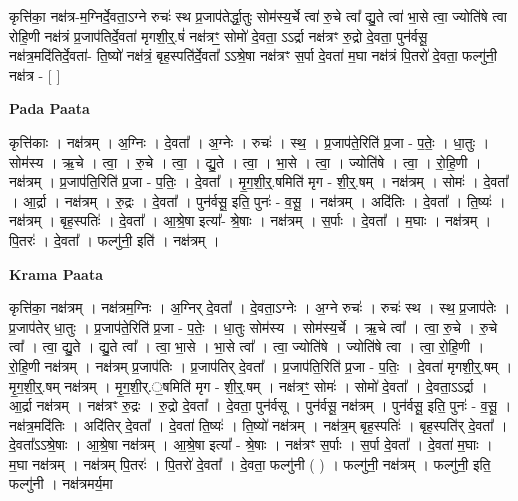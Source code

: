 \documentclass[17pt]{extarticle}
\begin{document}
कृत्ति॑का॒ नक्ष॑त्र-म॒ग्निर्दे॒वता॒ऽग्ने रुचः॑ स्थ प्र॒जाप॑तेर्द्धा॒तुः सोम॑स्य॒र्चे त्वा॑ रु॒चे त्वा᳚ द्यु॒ते त्वा॑ भा॒से त्वा॒ ज्योति॑षे त्वा रोहि॒णी नक्ष॑त्रं प्र॒जाप॑तिर्दे॒वता॑ मृगशी॒र्॒.षं॑ नक्ष॑त्रꣳ॒॒ सोमो॑ दे॒वता॒ ऽऽर्द्रा नक्ष॑त्रꣳ रु॒द्रो दे॒वता॒ पुन॑र्वसू॒ नक्ष॑त्र॒मदि॑तिर्दे॒वता॑- ति॒ष्यो॑ नक्ष॑त्रं॒ बृह॒स्पति॑र्दे॒वता᳚ ऽऽश्रे॒षा नक्ष॑त्रꣳ स॒र्पा दे॒वता॑ म॒घा नक्ष॑त्रं पि॒तरो॑ दे॒वता॒ फल्गु॑नी॒ नक्ष॑त्र - [  ] \newline

\textbf{Pada Paata} \newline

कृत्ति॑काः । नक्ष॑त्रम् । अ॒ग्निः । दे॒वता᳚ । अ॒ग्नेः । रुचः॑ । स्थ॒ । प्र॒जाप॑ते॒रिति॑ प्र॒जा - प॒तेः॒ । धा॒तुः । सोम॑स्य । ऋ॒चे । त्वा॒ । रु॒चे । त्वा॒ । द्यु॒ते । त्वा॒ । भा॒से । त्वा॒ । ज्योति॑षे । त्वा॒ । रो॒हि॒णी । नक्ष॑त्रम् । प्र॒जाप॑ति॒रिति॑ प्र॒जा - प॒तिः॒ । दे॒वता᳚ । मृ॒ग॒शी॒र्॒.षमिति॑ मृग - शी॒र्॒.षम् । नक्ष॑त्रम् । सोमः॑ । दे॒वता᳚ । आ॒र्द्रा । नक्ष॑त्रम् । रु॒द्रः । दे॒वता᳚ । पुन॑र्वसू॒ इति॒ पुनः॑ - व॒सू॒ । नक्ष॑त्रम् । अदि॑तिः । दे॒वता᳚ । ति॒ष्यः॑ । नक्ष॑त्रम् । बृह॒स्पतिः॑ । दे॒वता᳚ । आ॒श्रे॒षा इत्या᳚- श्रे॒षाः । नक्ष॑त्रम् । स॒र्पाः । दे॒वता᳚ । म॒घाः । नक्ष॑त्रम् । पि॒तरः॑ । दे॒वता᳚ । फल्गु॑नी॒ इति॑ । नक्ष॑त्रम् ।  \newline


\textbf{Krama Paata} \newline

कृत्ति॑का॒ नक्ष॑त्रम् । नक्ष॑त्रम॒ग्निः । अ॒ग्निर् दे॒वता᳚ । दे॒वता॒ऽग्नेः । अ॒ग्ने रुचः॑ । रुचः॑ स्थ । स्थ॒ प्र॒जाप॑तेः । प्र॒जाप॑तेर् धा॒तुः । प्र॒जाप॑ते॒रिति॑ प्र॒जा - प॒तेः॒ । धा॒तुः सोम॑स्य । सोम॑स्य॒र्चे । ऋ॒चे त्वा᳚ । त्वा॒ रु॒चे । रु॒चे त्वा᳚ । त्वा॒ द्यु॒ते । द्यु॒ते त्वा᳚ । त्वा॒ भा॒से । भा॒से त्वा᳚ । त्वा॒ ज्योति॑षे । ज्योति॑षे त्वा । त्वा॒ रो॒हि॒णी । रो॒हि॒णी नक्ष॑त्रम् । नक्ष॑त्रम् प्र॒जाप॑तिः । प्र॒जाप॑तिर् दे॒वता᳚ । प्र॒जाप॑ति॒रिति॑ प्र॒जा - प॒तिः॒ । दे॒वता॑ मृगशी॒र्॒.षम् । मृ॒ग॒शी॒र्॒.षम् नक्ष॑त्रम् । मृ॒ग॒शी॒र्.॒षमिति॑ मृग - शी॒र्॒.षम् । नक्ष॑त्रꣳ॒॒ सोमः॑ । सोमो॑ दे॒वता᳚ । दे॒वता॒ऽऽर्द्रा । आ॒र्द्रा नक्ष॑त्रम् । नक्ष॑त्रꣳ रु॒द्रः । रु॒द्रो दे॒वता᳚ । दे॒वता॒ पुन॑र्वसू । पुन॑र्वसू॒ नक्ष॑त्रम् । पुन॑र्वसू॒ इति॒ पुनः॑ - व॒सू॒ । नक्ष॑त्र॒मदि॑तिः । अदि॑तिर् दे॒वता᳚ । दे॒वता॑ ति॒ष्यः॑ । ति॒ष्यो॑ नक्ष॑त्रम् । नक्ष॑त्र॒म् बृह॒स्पतिः॑ । बृह॒स्पति॑र् दे॒वता᳚ । दे॒वता᳚ऽऽश्रे॒षाः । आ॒श्रे॒षा नक्ष॑त्रम् । आ॒श्रे॒षा इत्या᳚ - श्रे॒षाः । नक्ष॑त्रꣳ स॒र्पाः । स॒र्पा दे॒वता᳚ । दे॒वता॑ म॒घाः । म॒घा नक्ष॑त्रम् । नक्ष॑त्रम् पि॒तरः॑ । पि॒तरो॑ दे॒वता᳚ । दे॒वता॒ फल्गु॑नी ( ) । फल्गु॑नी॒ नक्ष॑त्रम् । फल्गु॑नी॒ इति॒ फल्गु॑नी । नक्ष॑त्रमर्य॒मा \newline
\end{document}
